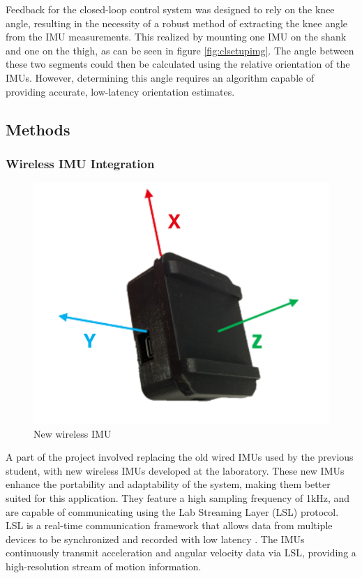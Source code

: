 

Feedback for the closed-loop control system was designed to rely on the knee angle, resulting in the necessity of a robust method of extracting the knee angle from the IMU measurements. This realized by mounting one IMU on the shank and one on the thigh, as can be seen in figure \ref{fig:clsetupimg}. The angle between these two segments could then be calculated using the relative orientation of the IMUs. However, determining this angle requires an algorithm capable of providing accurate, low-latency orientation estimates. 


\subsection{Methods}
\subsubsection{Wireless IMU Integration}
\begin{figure}
        \centering
    \includegraphics[width=\linewidth]{images/IMU_directions.png}
    \caption{New wireless IMU}
    \label{fig:imudirection}
\end{figure}
A part of the project involved replacing the old wired IMUs used by the previous student, with new wireless IMUs developed at the laboratory. These new IMUs enhance the portability and adaptability of the system, making them better suited for this application. They feature a high sampling frequency of 1kHz, and are capable of communicating using the Lab Streaming Layer (LSL) protocol. LSL is a real-time communication framework that allows data from multiple devices to be synchronized and recorded with low latency \cite{noauthor_lsl-website_nodate}. The IMUs continuously transmit acceleration and angular velocity data via LSL, providing a high-resolution stream of motion information.

